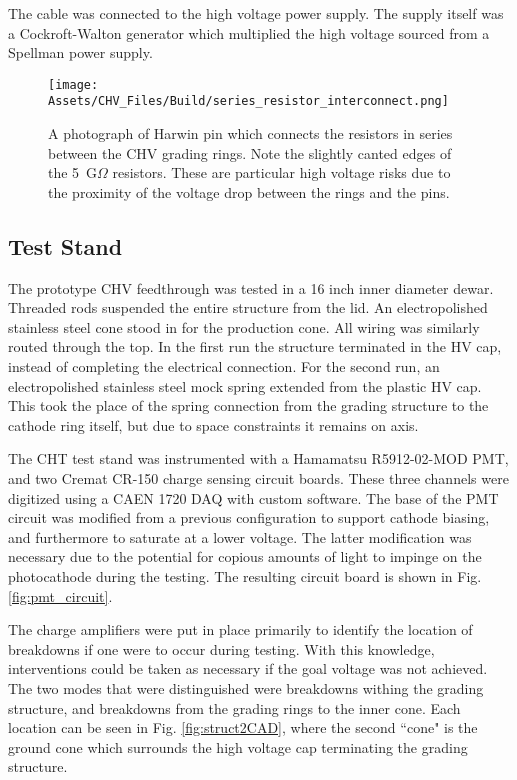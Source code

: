 The cable was connected to the high voltage power supply.
The supply itself was a Cockroft-Walton generator which multiplied the high voltage sourced from a Spellman power supply.

\begin{figure}
    \centering
    \texttt{[image: Assets/CHV\_Files/Build/series\_resistor\_interconnect.png]}
    \caption[A photograph of Harwin pin which connects the resistors in series between the CHV grading rings.]%
    {A photograph of Harwin pin which connects the resistors in series between the CHV grading rings.
    Note the slightly canted edges of the 5~G$\Omega$ resistors.
    These are particular high voltage risks due to the proximity of the voltage drop between the rings and the pins.}
    \label{fig:Harwin}
\end{figure}

\subsection{Test Stand}

The prototype CHV feedthrough was tested in a 16 inch inner diameter dewar.
Threaded rods suspended the entire structure from the lid.
An electropolished stainless steel cone stood in for the production cone.
All wiring was similarly routed through the top.
In the first run the structure terminated in the HV cap, instead of completing the electrical connection.
For the second run, an electropolished stainless steel mock spring extended from the plastic HV cap.
This took the place of the spring connection from the grading structure to the cathode ring itself, but due to space constraints it remains on axis.

The CHT test stand was instrumented with a Hamamatsu R5912-02-MOD PMT\cite{noauthor_large_nodate}, and two Cremat CR-150\cite{noauthor_cr-150-r5_nodate} charge sensing circuit boards. 
These three channels were digitized using a CAEN 1720 DAQ with custom software.
The base of the PMT circuit was modified from a previous configuration to support cathode biasing, and furthermore to saturate at a lower voltage.
The latter modification was necessary due to the potential for copious amounts of light to impinge on the photocathode during the testing.
The resulting circuit board is shown in Fig. \ref{fig:pmt_circuit}.


The charge amplifiers were put in place primarily to identify the location of breakdowns if one were to occur during testing.
With this knowledge, interventions could be taken as necessary if the goal voltage was not achieved. 
The two modes that were distinguished were breakdowns withing the grading structure, and breakdowns from the grading rings to the inner cone.
Each location can be seen in Fig. \ref{fig:struct2CAD}, where the second ``cone" is the ground cone which surrounds the high voltage cap terminating the grading structure.

